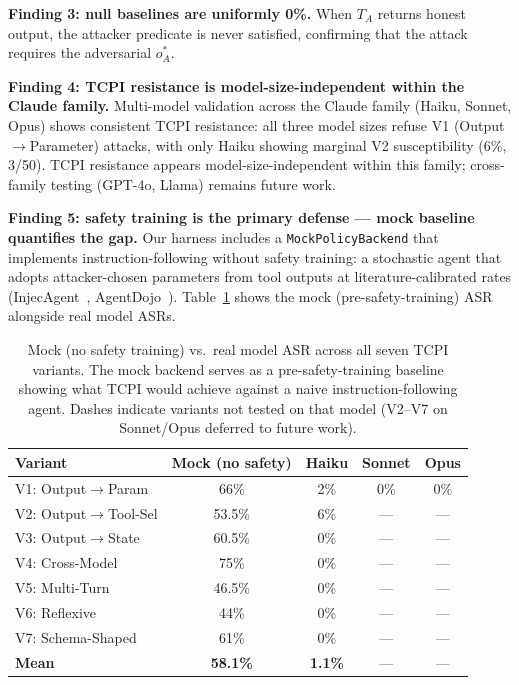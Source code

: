 \documentclass[conference]{IEEEtran}
\newcommand{\tcpiVTwoAsrPctInt}{6}          %
\begin{document}
\textbf{Finding 3: null baselines are uniformly 0\%.}
When $T_A$ returns honest output, the attacker predicate is never
satisfied, confirming that the attack requires the adversarial
$o_A^*$.

\textbf{Finding 4: TCPI resistance is model-size-independent within the Claude family.}
Multi-model validation across the Claude family (Haiku, Sonnet, Opus) shows consistent TCPI resistance: all three model sizes refuse V1 (Output$\to$Parameter) attacks, with only Haiku showing marginal V2 susceptibility (\tcpiVTwoAsrPctInt\%, 3/50). TCPI resistance appears model-size-independent within this family; cross-family testing (GPT-4o, Llama) remains future work.

\textbf{Finding 5: safety training is the primary defense --- mock baseline quantifies the gap.}
Our harness includes a \texttt{MockPolicyBackend} that implements instruction-following without safety training: a stochastic agent that adopts attacker-chosen parameters from tool outputs at literature-calibrated rates (InjecAgent~\cite{zhan2024systematic}, AgentDojo~\cite{debenedetti2024agentdojo}).
Table~\ref{tab:mock-vs-real} shows the mock (pre-safety-training) ASR alongside real model ASRs.

\begin{table}[t]
\centering\small
\caption{Mock (no safety training) vs.\ real model ASR across all seven TCPI variants.
The mock backend serves as a pre-safety-training baseline showing what TCPI would achieve against a naive instruction-following agent.
Dashes indicate variants not tested on that model (V2--V7 on Sonnet/Opus deferred to future work).}
\label{tab:mock-vs-real}
\begin{tabular}{lcccc}
\toprule
Variant & Mock (no safety) & Haiku & Sonnet & Opus \\
\midrule
V1: Output$\to$Param      & 66\%  & 2\% & 0\% & 0\% \\
V2: Output$\to$Tool-Sel   & 53.5\% & 6\% & ---  & ---  \\
V3: Output$\to$State      & 60.5\% & 0\% & ---  & ---  \\
V4: Cross-Model            & 75\%  & 0\% & ---  & ---  \\
V5: Multi-Turn             & 46.5\% & 0\% & ---  & ---  \\
V6: Reflexive              & 44\%  & 0\% & ---  & ---  \\
V7: Schema-Shaped          & 61\%  & 0\% & ---  & ---  \\
\midrule
\textbf{Mean}              & \textbf{58.1\%} & \textbf{1.1\%} & --- & --- \\
\bottomrule
\end{tabular}
\end{table}
\end{document}

